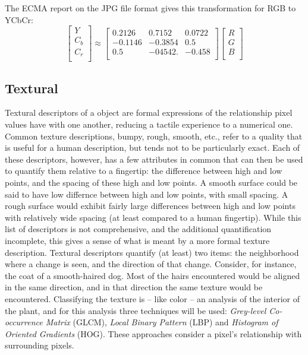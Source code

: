 \documentclass[letterpaper]{article}
\begin{document}
{The ECMA report on the JPG file format gives this transformation for RGB to YCbCr:
\nocite{Ecma2019-yo}
\begin{equation}
	\begin{bmatrix}
	Y \\[0.3em]
	C_b \\[0.3em]
	C_r \\[0.3em]
	\end{bmatrix}
	\approx
	\begin{bmatrix}
	0.2126 & 0.7152 & 0.0722 \\[0.3em]
	-0.1146 & -0.3854 & 0.5 \\[0.3em]
	0.5 & -04542. & -0.458 \\[0.3em]
	\end{bmatrix}
	\begin{bmatrix}
	R \\[0.3em]
	G \\[0.3em]
	B \\[0.3em]
	\end{bmatrix}	
\end{equation}




\subsection{Textural}
Textural descriptors of a object are formal expressions of the relationship pixel values have with one another, reducing a tactile experience to a numerical one. Common texture descriptions, bumpy, rough, smooth, etc., refer to a quality that is useful for a human description, but tends not to be particularly exact. Each of these descriptors, however, has a few attributes in common that can then be used to quantify them relative to a fingertip: the difference between high and low points, and the spacing of these high and low points. A smooth surface could be said to have low differnce between high and low points, with small spacing. A rough surface would exhibit fairly large differences between high and low points with relatively wide spacing (at least compared to a human fingertip). While this list of descriptors is not comprehensive, and the additional quantification incomplete, this gives a sense of what is meant by a more formal texture description. Textural descriptors quantify (at least) two items: the neighborhood where a change is seen, and the direction of that change. Consider, for instance, the coat of a smooth-haired dog. Most of the hairs encountered would be aligned in the same direction, and in that direction the same texture would be encountered.
Classifying the texture is -- like color -- an analysis of the interior of the plant, and for this analysis three techniques will be used:  \textit{Grey-level Co-occurrence Matrix} (GLCM), \textit{Local Binary Pattern} (LBP) and \textit{Histogram of Oriented Gradients} (HOG). These approaches consider a pixel's relationship with surrounding pixels.

}
\end{document}
